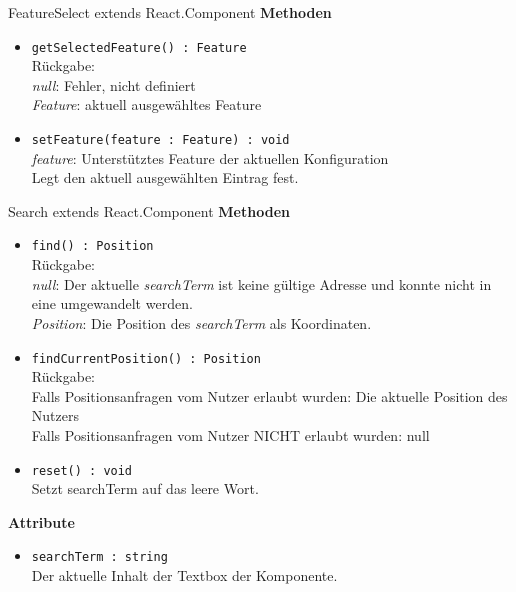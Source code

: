     \begin{Class}{FeatureSelect extends React.Component}
        \textbf{Methoden}
        \begin{itemize}
            \item \texttt{getSelectedFeature() : Feature}
            \\ Rückgabe:
            \\ \emph{null}: Fehler, nicht definiert
            \\ \emph{Feature}: aktuell ausgewähltes Feature
            \item \texttt{setFeature(feature : Feature) : void}
            \\ \emph{feature}: Unterstütztes Feature der aktuellen Konfiguration
            \\ Legt den aktuell ausgewählten Eintrag fest.
        \end{itemize}
    \end{Class}

    \begin{Class}{Search extends React.Component}
        \textbf{Methoden}
        \begin{itemize}
            \item \texttt{find() : Position}
            \\ Rückgabe:
            \\ \emph{null}: Der aktuelle \emph{searchTerm} ist keine gültige Adresse und konnte nicht in eine umgewandelt werden.
            \\ \emph{Position}: Die Position des \emph{searchTerm} als Koordinaten.
            \item \texttt{findCurrentPosition() : Position}
            \\ Rückgabe:
            \\ Falls Positionsanfragen vom Nutzer erlaubt wurden: Die aktuelle Position des Nutzers
            \\ Falls Positionsanfragen vom Nutzer NICHT erlaubt wurden: null
            \item \texttt{reset() : void}
            \\ Setzt searchTerm auf das leere Wort.
        \end{itemize}
        \textbf{Attribute}
        \begin{itemize}
            \item \texttt{searchTerm : string}
            \\ Der aktuelle Inhalt der Textbox der Komponente.
        \end{itemize}
    \end{Class}
    
